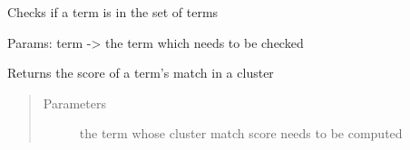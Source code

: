 \documentclass[letterpaper,10pt,english]{sphinxmanual}
\begin{document}
\begin{fulllineitems}
\begin{fulllineitems}
\begin{quote}
\begin{description}
\end{description}\end{quote}

\end{fulllineitems}


\begin{fulllineitems}
\label{\detokenize{src.cluster:src.cluster.Cluster.Cluster.get_sorted_terms}}
\end{fulllineitems}


\begin{fulllineitems}
\label{\detokenize{src.cluster:src.cluster.Cluster.Cluster.has_term}}
Checks if a term is in the set of terms

Params: term -\textgreater{} the term which needs to be checked

\end{fulllineitems}


\begin{fulllineitems}
\label{\detokenize{src.cluster:src.cluster.Cluster.Cluster.is_in_trie}}
\end{fulllineitems}


\begin{fulllineitems}
\label{\detokenize{src.cluster:src.cluster.Cluster.Cluster.is_leader}}
\end{fulllineitems}


\begin{fulllineitems}
\label{\detokenize{src.cluster:src.cluster.Cluster.Cluster.match_score}}
Returns the score of a term’s match in a cluster
\begin{quote}\begin{description}
\item[{Parameters}] \leavevmode
{} \textendash{} the term whose cluster match score needs to be computed


\end{description}
\end{quote}
\end{fulllineitems}
\end{fulllineitems}
\end{document}
